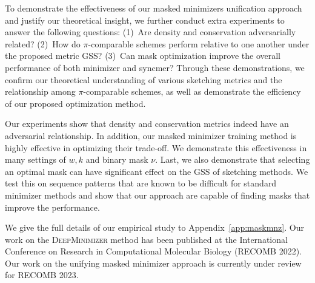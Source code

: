 To demonstrate the effectiveness of our masked minimizers unification approach and justify our theoretical insight, we further conduct extra experiments to answer the following questions:
(1)~Are density and conservation adversarially related? (2)~How do $\pi$-comparable schemes perform relative to one another under the proposed metric GSS? (3)~Can mask optimization improve the overall performance of both minimizer and syncmer? Through these demonstrations, we confirm our theoretical understanding of various sketching metrics and the relationship among $\pi$-comparable schemes, as well as demonstrate the efficiency of our proposed optimization method.

Our experiments show that density and conservation metrics indeed have an adversarial relationship. In addition, our masked minimizer training method is highly effective in optimizing their trade-off. We demonstrate this effectiveness in many settings of $w, k$ and binary mask $\nu$. Last, we also demonstrate that selecting an optimal mask can have significant effect on the GSS of sketching methods. We test this on sequence patterns that are known to be difficult for standard minimizer methods and show that our approach are capable of finding masks that improve the performance.

We give the full details of our empirical study to Appendix~\ref{app:maskmnz}. Our work on the \textsc{DeepMinimizer} method has been published at the International Conference on Research in Computational Molecular Biology (RECOMB 2022). Our work on the unifying masked minimizer approach is currently under review for RECOMB 2023.